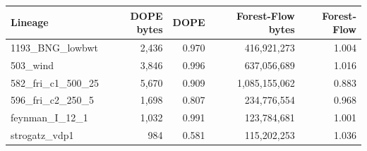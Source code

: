 \begin{tabular}{@{}lrrrr@{}}
\toprule
Lineage & DOPE bytes & DOPE & Forest-Flow bytes & Forest-Flow \\
\midrule
1193\_BNG\_lowbwt & 2{,}436 & 0.970 & 416{,}921{,}273 & 1.004 \\
503\_wind & 3{,}846 & 0.996 & 637{,}056{,}689 & 1.016 \\
582\_fri\_c1\_500\_25 & 5{,}670 & 0.909 & 1{,}085{,}155{,}062 & 0.883 \\
596\_fri\_c2\_250\_5 & 1{,}698 & 0.807 & 234{,}776{,}554 & 0.968 \\
feynman\_I\_12\_1 & 1{,}032 & 0.991 & 123{,}784{,}681 & 1.001 \\
strogatz\_vdp1 & 984 & 0.581 & 115{,}202{,}253 & 1.036 \\
\bottomrule
\end{tabular}
